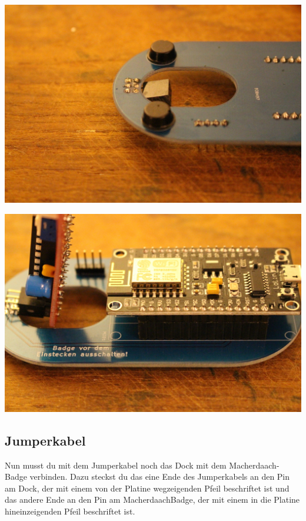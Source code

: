 \documentclass{article}
\begin{document}
\begin{minipage}[b]{0.5\textwidth}
	\includegraphics[width=\textwidth]{Bilder2019/IMG_6488.JPG}
\end{minipage}
\begin{minipage}[b]{0.5\textwidth}
	\includegraphics[width=\textwidth]{Bilder2019/IMG_6489.JPG}
\end{minipage}

\subsection{Jumperkabel}

Nun musst du mit dem Jumperkabel noch das Dock mit dem Macherdaach-Badge verbinden. Dazu steckst du das eine Ende des Jumperkabels an den Pin am Dock, der mit einem von der Platine wegzeigenden Pfeil beschriftet ist und das andere Ende an den Pin am MacherdaachBadge, der mit einem in die Platine hineinzeigenden Pfeil beschriftet ist.
\end{document}
